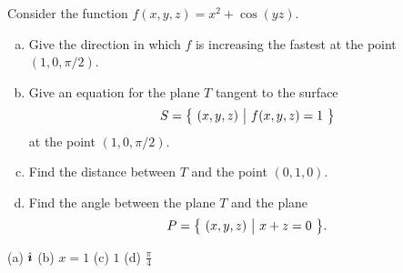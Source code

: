 \begin{solution}


\end{solution}



\begin{question}[M200 2008A] %
Consider the function $f(x,y,z) = x^2 + \cos(yz)$.

\begin{enumerate}[(a)]
\item
Give the direction in which $f$ is increasing the fastest at the point 
$(1, 0, \pi/2)$.

\item
Give an equation for the plane $T$ tangent to the surface 
\begin{equation*}
S = \big\{ \ (x,y,z)\ \big|\ f(x,y,z) = 1\ \big\}
\end{equation*}
at the point $(1, 0, \pi/2)$.

\item
Find the distance between $T$ and the point $(0, 1, 0)$.

\item
Find the angle between the plane $T$ and the plane
\begin{equation*}
P = \big\{ \ (x,y,z)\ \big|\ x + z = 0\ \big\}.
\end{equation*}

\end{enumerate}
\end{question}

%

\begin{answer}
(a) $\hat{\pmb{\imath}}$\qquad
(b) $x=1$\qquad
(c) $1$\qquad
(d) $\frac{\pi}{4}$
\end{answer}

